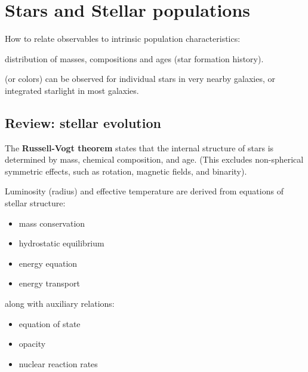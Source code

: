 \documentclass{article}
\begin{document}
\section{Stars and Stellar populations}
How to relate observables to intrinsic population characteristics:
\begin{description}[labelwidth=14em, leftmargin=18em]
    \item [Population characteristics:] distribution of masses, compositions
        and ages (star formation history).
    \item [Stellar SEDs] (or colors) can be observed for
        individual stars in very nearby galaxies, or integrated starlight
        in most galaxies.
\end{description}

\subsection{Review: stellar evolution}
The \textbf{Russell-Vogt theorem} states that the
internal structure of stars is determined by mass, chemical
composition, and age. (This excludes
non-spherical symmetric effects, such as rotation, magnetic
fields, and binarity).

Luminosity (radius) and effective temperature are derived from
equations of stellar structure:
\begin{itemize}
    \item mass conservation
    \item hydrostatic equilibrium
    \item energy equation
    \item energy transport
\end{itemize}
along with auxiliary relations:
\begin{itemize}
    \item equation of state
    \item opacity
    \item nuclear reaction rates
\end{itemize}
\end{document}
